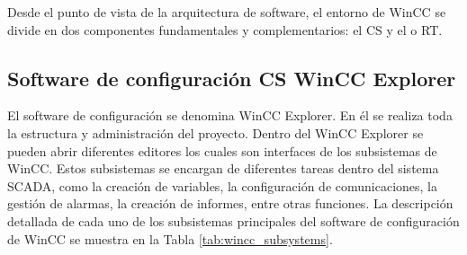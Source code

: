 \par \indent Desde el punto de vista de la arquitectura de software, el entorno de WinCC se divide en dos componentes fundamentales y complementarios: el \ac{CS} y el o \ac{RT}.

\subsection{Software de configuración \ac{CS} WinCC Explorer}
El software de configuración se denomina WinCC Explorer. En él se realiza toda la estructura y administración del proyecto. Dentro del WinCC Explorer se pueden abrir diferentes editores los cuales son interfaces de los subsistemas de WinCC. Estos subsistemas se encargan de diferentes tareas dentro del sistema SCADA, como la creación de variables, la configuración de comunicaciones, la gestión de alarmas, la creación de informes, entre otras funciones. La descripción detallada de cada uno de los subsistemas principales del software de configuración de WinCC se muestra en la Tabla \ref{tab:wincc_subsystems}.
\begin{table}[tb]
    \centering
    \caption{Descripción de los subsistemas principales del software de configuración de WinCC (\textit{CS}).}
\end{table}
